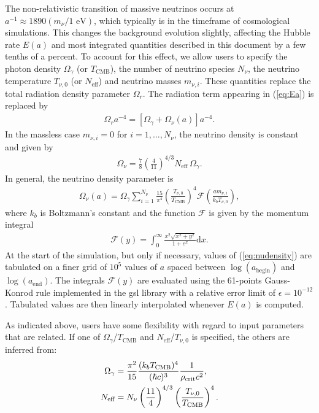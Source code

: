 The non-relativistic transition of massive neutrinos occurs at
$a^{-1}\approx 1890 (m_\nu/1\text{ eV})$, which typically is in the timeframe of
cosmological simulations. This changes the background evolution slightly,
affecting the Hubble rate $E(a)$ and most integrated quantities described in this
document by a few tenths of a percent. To account for this effect, we allow users
to specify the photon density $\Omega_\gamma$ (or $T_\text{CMB}$), the number of
neutrino species $N_\nu$, the neutrino temperature $T_{\nu,0}$ (or $N_\text{eff}$)
and neutrino masses $m_{\nu,i}$. These quantities replace the total radiation
density parameter $\Omega_r$. The radiation term appearing in (\ref{eq:Ea}) is
replaced by
\begin{align}
    \Omega_r a^{-4} = \left[\Omega_\gamma + \Omega_\nu(a)\right] a^{-4}.
\end{align}
In the massless case $m_{\nu,i}=0$ for $i=1,\dots,N_\nu$, the neutrino density is constant and given by
\begin{align}
    \Omega_\nu = \frac{7}{8}\left(\frac{4}{11}\right)^{4/3} N_\text{eff}\,\Omega_\gamma.
\end{align}
In general, the neutrino density parameter is \citep{Zennaro2016}
\begin{align}
    \Omega_\nu(a) = \Omega_\gamma \sum_{i=1}^{N_\nu}\frac{15}{\pi^4}\left(\frac{T_{\nu,0}}{T_\text{CMB}}\right)^4 \mathcal{F}\left(\frac{a m_{\nu,i}}{k_b T_{\nu,0}}\right), \label{eq:nudensity}
\end{align}
where $k_b$ is Boltzmann's constant and the function $\mathcal{F}$ is given by the momentum integral
%
\begin{align}
    \mathcal{F}(y) = \int_0^{\infty} \frac{x^2\sqrt{x^2+y^2}}{1+e^{x}}\mathrm{d}x.
\end{align}
At the start of the simulation, but only if necessary, values of
(\ref{eq:nudensity}) are tabulated on a finer grid of $10^5$ values of $a$ spaced
between $\log(a_\text{begin})$ and $\log(a_\text{end})$. The integrals
$\mathcal{F}(y)$ are evaluated using the 61-points Gauss-Konrod rule implemented
in the {\sc gsl} library with a relative error limit of $\epsilon=10^{-12}$.
Tabulated values are then linearly interpolated whenever $E(a)$ is computed.

As indicated above, users have some flexibility with regard to input parameters
that are related. If one of $\Omega_\gamma$/$T_\text{CMB}$ and $N_\text{eff}$/$T_{\nu,0}$
is specified, the others are inferred from:
%
\begin{align}
    \Omega_\gamma &= \frac{\pi^2}{15}\frac{(k_b T_\text{CMB})^4}{(\hbar c)^3}\frac{1}{\rho_{\rm crit}c^2},\\
    N_\text{eff} &= N_\nu\left(\frac{11}{4}\right)^{4/3}\left(\frac{T_{\nu,0}}{T_\text{CMB}}\right)^4.
\end{align}
